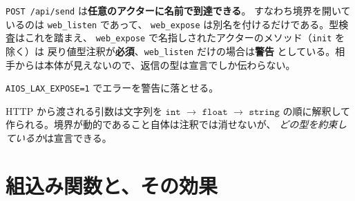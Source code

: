 \documentclass[11pt,a4paper]{ltjsarticle}
\newcommand{\ty}[1]{\ensuremath{\mathtt{#1}}}
\begin{document}
\texttt{POST /api/send} は\textbf{任意のアクターに名前で到達できる}。
すなわち境界を開いているのは \texttt{web\_listen} であって、
\texttt{web\_expose} は別名を付けるだけである。型検査はこれを踏まえ、
\texttt{web\_expose} で名指しされたアクターのメソッド（\texttt{init} を除く）は
戻り値型注釈が\textbf{必須}、\texttt{web\_listen} だけの場合は\textbf{警告}
としている。相手からは本体が見えないので、返信の型は宣言でしか伝わらない。

\texttt{AIOS\_LAX\_EXPOSE=1} でエラーを警告に落とせる。

HTTP から渡される引数は文字列を \ty{int} $\to$ \ty{float} $\to$ \ty{string}
の順に解釈して作られる。境界が動的であること自体は注釈では消せないが、
\emph{どの型を約束しているか}は宣言できる。

\section{組込み関数と、その効果}
\label{sec:builtins}
\end{document}
